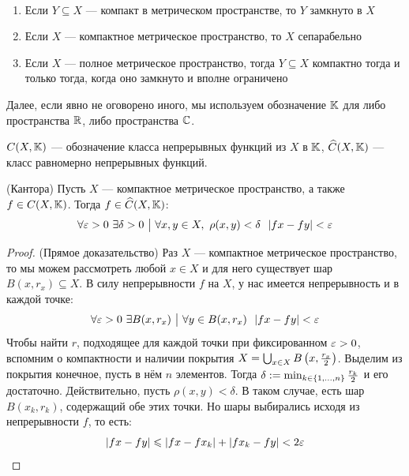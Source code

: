 \begin{exercise}~
	\begin{enumerate}
		\item Если $Y \subseteq X$ --- компакт в метрическом пространстве, то $Y$ замкнуто в $X$
		
		\item Если $X$ --- компактное метрическое пространство, то $X$ сепарабельно
		
		\item Если $X$ --- полное метрическое пространство, тогда $Y \subseteq X$ компактно тогда и только тогда, когда оно замкнуто и вполне ограничено
	\end{enumerate}
\end{exercise}

\begin{note}
	Далее, если явно не оговорено иного, мы используем обозначение $\mathbb{K}$ для либо пространства $\mathbb{R}$, либо пространства $\mathbb{C}$.
\end{note}

\begin{note}
	$C(X, \mathbb{K})$ --- обозначение класса непрерывных функций из $X$ в $\mathbb{K}$, $\widehat{C}(X, \mathbb{K})$ --- класс равномерно непрерывных функций.
\end{note}

\begin{theorem} (Кантора)
	Пусть $X$ --- компактное метрическое пространство, а также $f \in C(X, \mathbb{K})$. Тогда $f \in \widehat{C}(X, \mathbb{K})$:
	\[
		\forall \varepsilon > 0\ \exists \delta > 0 \ \big|\  \forall x, y \in X,\ \rho(x, y) < \delta\ \ |fx - fy| < \varepsilon
	\]
\end{theorem}

\begin{proof} (Прямое доказательство)
	Раз $X$ --- компактное метрическое пространство, то мы можем рассмотреть любой $x \in X$ и для него существует шар $B(x, r_x) \subseteq X$. В силу непрерывности $f$ на $X$, у нас имеется непрерывность и в каждой точке:
	\[
		\forall \varepsilon > 0\ \exists B(x, r_x) \ \big|\  \forall y \in B(x, r_x)\ \ |fx - fy| < \varepsilon
	\]
	Чтобы найти $r$, подходящее для каждой точки при фиксированном $\varepsilon > 0$, вспомним о компактности и наличии покрытия $X = \bigcup_{x \in X} B\left(x, \frac{r_x}{2}\right)$. Выделим из покрытия конечное, пусть в нём $n$ элементов. Тогда $\delta := \min_{k \in \{1, \ldots, n\}} \frac{r_k}{2}$ и его достаточно. Действительно, пусть $\rho(x, y) < \delta$. В таком случае, есть шар $B(x_k, r_k)$, содержащий обе этих точки. Но шары выбирались исходя из непрерывности $f$, то есть:
	\[
		|fx - fy| \leqslant |fx - fx_k| + |fx_k - fy| < 2\varepsilon
	\]
\end{proof}

